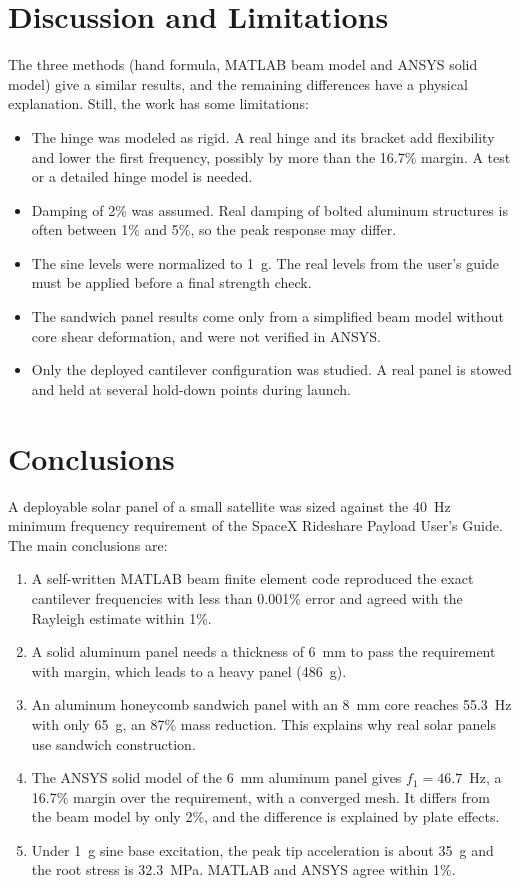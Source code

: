 \documentclass[letterpaper,10pt]{article}
\begin{document}
\section{Discussion and Limitations}

The three methods (hand formula, MATLAB beam model and ANSYS solid model) give a
similar results, and the remaining differences have a physical explanation.
Still, the work has some limitations:
\begin{itemize}[nosep,leftmargin=2.5em]
  \item The hinge was modeled as rigid. A real hinge and its bracket add flexibility
        and lower the first frequency, possibly by more than the 16.7\% margin. A test
        or a detailed hinge model is needed.
  \item Damping of 2\% was assumed. Real damping of bolted aluminum structures is
        often between 1\% and 5\%, so the peak response may differ.
  \item The sine levels were normalized to 1~g. The real levels from the user's guide
        must be applied before a final strength check.
  \item The sandwich panel results come only from a simplified beam model without core
        shear deformation, and were not verified in ANSYS.
  \item Only the deployed cantilever configuration was studied. A real panel is stowed
        and held at several hold-down points during launch.
\end{itemize}

\section{Conclusions}

A deployable solar panel of a small satellite was sized against the 40~Hz minimum
frequency requirement of the SpaceX Rideshare Payload User's Guide. The main
conclusions are:
\begin{enumerate}[nosep,leftmargin=2.5em]
  \item A self-written MATLAB beam finite element code reproduced the exact cantilever
        frequencies with less than 0.001\% error and agreed with the Rayleigh estimate
        within 1\%.
  \item A solid aluminum panel needs a thickness of 6~mm to pass the requirement with
        margin, which leads to a heavy panel (486~g).
  \item An aluminum honeycomb sandwich panel with an 8~mm core reaches 55.3~Hz with only
        65~g, an 87\% mass reduction. This explains why real solar panels use sandwich
        construction.
  \item The ANSYS solid model of the 6~mm aluminum panel gives $f_1 = 46.7$~Hz, a 16.7\%
        margin over the requirement, with a converged mesh. It differs from the beam
        model by only 2\%, and the difference is explained by plate effects.
  \item Under 1~g sine base excitation, the peak tip acceleration is about 35~g and the
        root stress is 32.3~MPa. MATLAB and ANSYS agree within 1\%.
\end{enumerate}
\end{document}
